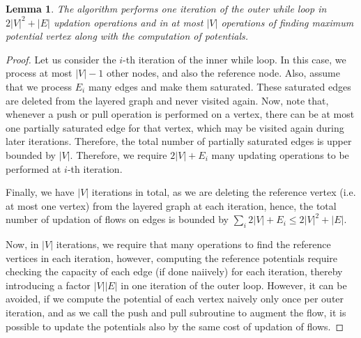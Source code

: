 \documentclass[12pt]{article}
\newtheorem{lemma}{Lemma}[section]
\begin{document}
\begin{lemma}
	The algorithm performs one iteration of the outer while loop in $2|V|^2 + |E|$ updation operations and in at most $|V|$ operations of finding maximum potential vertex along with the computation of potentials.
\end{lemma}
\begin{proof}
	Let us consider the $i$-th iteration of the inner while loop. In this case, we process at most $|V|-1$ other nodes, and also the reference node. Also, assume that we process $E_i$ many edges and make them saturated. These saturated edges are deleted from the layered graph and never visited again. Now, note that, whenever a push or pull operation is performed on a vertex, there can be at most one partially saturated edge for that vertex, which may be visited again during later iterations. Therefore, the total number of partially saturated edges is upper bounded by $|V|$. Therefore, we require $2|V|+E_i$ many updating operations to be performed at $i$-th iteration.\par 
	Finally, we have $|V|$ iterations in total, as we are deleting the reference vertex (i.e. at most one vertex) from the layered graph at each iteration, hence, the total number of updation of flows on edges is bounded by $\sum_i {2|V|+E_i} \leq 2|V|^2+|E|$.\par 
	Now, in $|V|$ iterations, we require that many operations to find the reference vertices in each iteration, however, computing the reference potentials require checking the capacity of each edge (if done naiively) for each iteration, thereby introducing a factor $|V||E|$ in one iteration of the outer loop. However, it can be avoided, if we compute the potential of each vertex naively only once per outer iteration, and as we call the push and pull subroutine to augment the flow, it is possible to update the potentials also by the same cost of updation of flows.
\end{proof}
\end{document}
